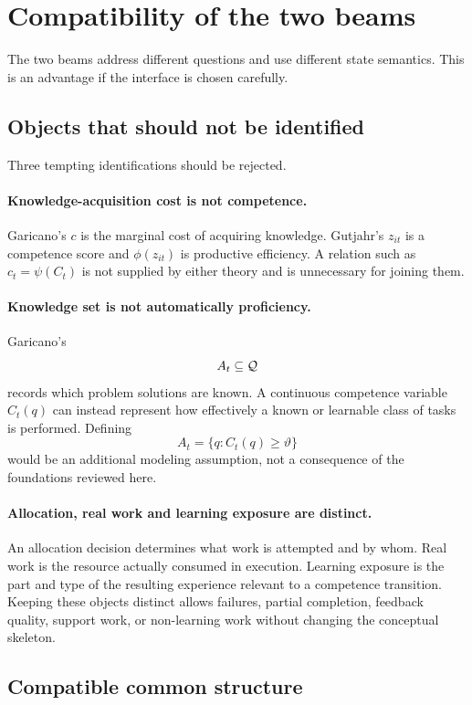 \section{Compatibility of the two beams}

The two beams address different questions and use different state semantics. This is an
advantage if the interface is chosen carefully.

\subsection{Objects that should not be identified}

Three tempting identifications should be rejected.

\paragraph{Knowledge-acquisition cost is not competence.}
Garicano's \(c\) is the marginal cost of acquiring knowledge. Gutjahr's \(z_{it}\) is a
competence score and \(\phi(z_{it})\) is productive efficiency. A relation such as
\(c_t=\psi(C_t)\) is not supplied by either theory and is unnecessary for joining them.

\paragraph{Knowledge set is not automatically proficiency.}
Garicano's
\[
A_t\subseteq\mathcal{Q}
\]
records which problem solutions are known. A continuous competence variable \(C_t(q)\)
can instead represent how effectively a known or learnable class of tasks is performed.
Defining
\[
A_t=\{q:C_t(q)\geq\vartheta\}
\]
would be an additional modeling assumption, not a consequence of the foundations reviewed
here.

\paragraph{Allocation, real work and learning exposure are distinct.}
An allocation decision determines what work is attempted and by whom. Real work is the
resource actually consumed in execution. Learning exposure is the part and type of the
resulting experience relevant to a competence transition. Keeping these objects distinct
allows failures, partial completion, feedback quality, support work, or non-learning work
without changing the conceptual skeleton.

\subsection{Compatible common structure}

